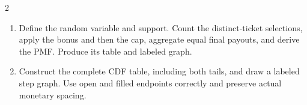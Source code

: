 \begin{multicols*}{2}
\begin{enumerate}[label=(\alph*)]
\item Define the random variable and support. Count the distinct-ticket selections, apply the bonus and then the cap, aggregate equal final payouts, and derive the PMF. Produce its table and labeled graph. 
\item Construct the complete CDF table, including both tails, and draw a labeled step graph. Use open and filled endpoints correctly and preserve actual monetary spacing. 
\end{enumerate}
\end{multicols*}

